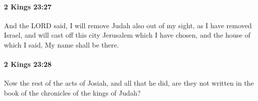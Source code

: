 		\paragraph{2 Kings 23:27} %
			\label{2KINGS-23-27}

			And the LORD said, I will remove Judah also out of my sight, as I have removed Israel, and will cast off this city Jerusalem which I have chosen, and the house of which I said, My name shall be there.


		\paragraph{2 Kings 23:28} %
			\label{2KINGS-23-28}

			Now the rest of the acts of Josiah, and all that he did, are they not written in the book of the chronicles of the kings of Judah?


